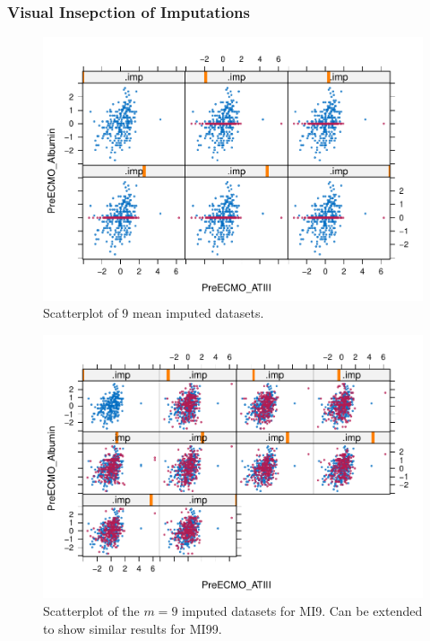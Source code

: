 \documentclass[12pt,]{article}
\newcommand{\appendixC}{ \setcounter{table}{0} \renewcommand{\thetable}{C\arabic{table}} \setcounter{figure}{0} \renewcommand{\thefigure}{C\arabic{figure}} }
\begin{document}
\appendixC

\subsubsection{Visual Insepction of
Imputations}\label{visual-insepction-of-imputations}

\begin{figure}[H]

{\centering \includegraphics[width=0.75\linewidth]{figure/graphics-unnamed-chunk-14-1} 

}

\caption{\label{fig:xyplot-mean}Scatterplot of 9 mean imputed datasets.}\label{fig:unnamed-chunk-14}
\end{figure}

\begin{figure}[H]

{\centering \includegraphics[width=0.75\linewidth]{figure/graphics-unnamed-chunk-15-1} 

}

\caption{\label{fig:xyplot-pmm}Scatterplot of the $m=9$ imputed datasets for MI9.  Can be extended to show similar results for MI99.}\label{fig:unnamed-chunk-15}
\end{figure}
\end{document}
